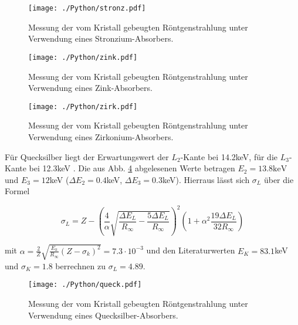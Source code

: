 \begin{figure}
  \centering
  \texttt{[image: ./Python/stronz.pdf]}
  \caption{Messung der vom Kristall gebeugten Röntgenstrahlung unter Verwendung eines Stronzium-Absorbers.}
  \label{fig:stronz}
\end{figure}



\begin{figure}
  \centering
  \texttt{[image: ./Python/zink.pdf]}
  \caption{Messung der vom Kristall gebeugten Röntgenstrahlung unter Verwendung eines Zink-Absorbers.}
  \label{fig:zink}
\end{figure}



\begin{figure}
  \centering
  \texttt{[image: ./Python/zirk.pdf]}
  \caption{Messung der vom Kristall gebeugten Röntgenstrahlung unter Verwendung eines Zirkonium-Absorbers.}
  \label{fig:brom}
\end{figure}

Für Quecksilber liegt der Erwartungswert der $L_2$-Kante bei 14.2keV, für die $L_3$-Kante bei 12.3keV \cite{skuld}. Die aus Abb. \ref{fig:queck} abgelesenen Werte betragen $E_2 = 13.8 \si{\kilo \electronvolt}$ und $E_3 = 12$keV ($\Delta E_2 = 0.4$keV, $\Delta E_3 = 0.3$keV).
Hierraus lässt sich $\sigma_L$ über die Formel

\begin{equation}
  \sigma_L = Z - \left(\frac{4}{\alpha}\sqrt{\frac{\Delta E_L}{R_\infty}-\frac{5\Delta E_L}{R_\infty}}\right)^2 \left(1+\alpha^2   \frac{19\Delta E_L}{32 R_\infty}\right)
\end{equation}

mit $\alpha = \frac{2}{Z} \sqrt{\frac{E_k}{R_\infty} (Z-\sigma_k)^2} = 7.3 \cdot 10^{-3}$ und den Literaturwerten $E_K = 83.1$keV \cite{skuld} und $\sigma_K = 1.8$ berrechnen zu $\sigma_L = 4.89$.

\begin{figure}
  \centering
  \texttt{[image: ./Python/queck.pdf]}
  \caption{Messung der vom Kristall gebeugten Röntgenstrahlung unter Verwendung eines Quecksilber-Absorbers.}
  \label{fig:queck}
\end{figure}
